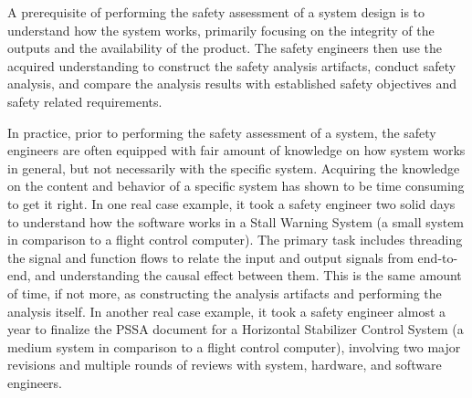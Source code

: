 A prerequisite of performing the safety assessment of a system design is to understand how the system works, primarily focusing on the integrity of the outputs and the availability of the product. The safety engineers then use the acquired understanding to construct the safety analysis artifacts, conduct safety analysis, and compare the analysis results with established safety objectives and safety related requirements. 

In practice, prior to performing the safety assessment of a system, the safety engineers are often equipped with fair amount of knowledge on how system works in general, but not necessarily with the specific system. Acquiring the knowledge on the content and behavior of a specific system has shown to be time consuming to get it right. In one real case example, it took a safety engineer two solid days to understand how the software works in a Stall Warning System (a small system in comparison to a flight control computer). The primary task includes threading the signal and function flows to relate the input and output signals from end-to-end, and understanding the causal effect between them. This is the same amount of time, if not more, as constructing the analysis artifacts and performing the analysis itself. In another real case example, it took a safety engineer almost a year to finalize the PSSA document for a Horizontal Stabilizer Control System (a medium system in comparison to a flight control computer), involving two major revisions and multiple rounds of reviews with system, hardware, and software engineers.

